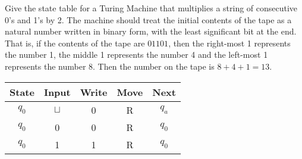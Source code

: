 \documentclass[a4paper, 12pt]{exam}
\begin{document}
\begin{questions}
\question
  Give the state table for a Turing Machine that multiplies a string of consecutive 0's and 1's by 2.
  The machine should treat the initial contents of the tape as a natural number written in binary form, with the least significant bit at the end.
  That is, if the contents of the tape are \( 01101 \), then the right-most 1 represents the number 1, the middle 1 represents the number 4 and the left-most 1 represents the number 8.
  Then the number on the tape is \( 8+4+1=13 \).
  \begin{solution}
    \begin{table}[H]
      \centering
      \begin{tabular}{ccccc}
        \toprule
            State & Input & Write & Move & Next \\
        \midrule
            \( q_0 \) & \( \sqcup \) & 0 & R & \( q_a \) \\
            \( q_0 \) & 0 & 0 & R & \( q_0 \) \\
            \( q_0 \) & 1 & 1 & R & \( q_0 \) \\
        \bottomrule
        \hline
      \end{tabular}
    \end{table}
  \end{solution}



\end{questions}
\end{document}

